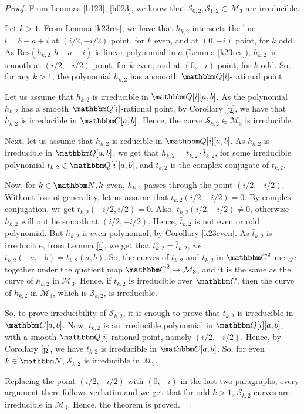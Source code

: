 \documentclass[reqno]{amsart}
\numberwithin{equation}{section}
\theoremstyle{plain}
\theoremstyle{definition}
\theoremstyle{definition}
\newcommand{\Q}{{\mathbbm Q}}
\newcommand{\C}{{\mathbbm C}}
\newcommand{\N}{{\mathbbm N}}
\newcommand{\ie}{\;\textit{i}.\textit{e}.\;\;}
\begin{document}
    \begin{proof}
        From Lemmas \ref{h123}, \ref{h023}, we know that $\mathscr{S}_{0,2}, \mathscr{S}_{1,2} \subset \mathcal{M}_{3}$ are irreducible.

        Let $k>1$. From Lemma \ref{k23res}, we have that $h_{k,2}$ intersects the line $l= b-a+i$ at $(i/2,-i/2)$ point, for $k$ even, and at $(0,-i)$ point, for $k$ odd. As $\mbox{Res}(h_{k,2},b-a+i)$ is linear polynomial in $a$ (Lemma \ref{k23res}), $h_{k,2}$ is smooth at $(i/2,-i/2)$ point, for $k$ even, and at $(0,-i)$ point, for $k$ odd. So, for any $k>1$, the polynomial $h_{k,2}$ has a smooth $\Q[i]$-rational point.

        Let us assume that $h_{k,2}$ is irreducible in $\Q[i][a,b]$. As the polynomial $h_{k,2}$ has a smooth $\Q[i]$-rational point, by Corollary \ref{p}, we have that $h_{k,2}$ is irreducible in $\C[a,b]$. Hence, the curve $\mathscr{S}_{k,2}\in \mathcal{M}_{3}$ is irreducible.

        Next, let us assume that $h_{k,2}$ is reducible in $\Q[i][a,b]$. As $h_{k,2}$ is irreducible in $\Q[a,b]$, we get that $h_{k,2}= t_{k,2} \cdot \bar{t}_{k,2}$, for some irreducible polynomial $t_{k,2}\in \Q[i][a,b]$, and $\bar{t}_{k,2}$ is the complex conjugate of $t_{k,2}$.

        Now, for $k\in \N, k$ even, $h_{k,2}$ passes through the point $(i/2,-i/2)$. Without loss of generality, let us assume that $t_{k,2}(i/2,-i/2)=0$. By complex conjugation, we get $\bar{t}_{k,2}(-i/2,i/2)=0$. Also, $\bar{t}_{k,2}(i/2,-i/2)\neq 0$, otherwise $h_{k,2}$ will not be smooth at $(i/2,-i/2)$. Hence, $\bar{t}_{k,2}$ is not even or odd polynomial. But $h_{k,2}$ is even polynomial, by Corollary \ref{k23even}. As $\bar{t}_{k,2}$ is irreducible, from Lemma \ref{t}, we get that $t_{k,2}^{\diamond} = \bar{t}_{k,2}$, \ie  $t_{k,2}(-a,-b)=\bar{t}_{k,2}(a,b)$. So, the curves of $t_{k,2}$ and $\bar{t}_{k,2}$ in $\C^{2}$ merge together under the quotient map $\C^{2}\rightarrow \mathcal{M}_{3}$, and it is the same as the curve of $h_{k,2}$ in $\mathcal{M}_{3}$. Hence, if $t_{k,2}$ is irreducible over $\C$, then the curve of $h_{k,2}$ in $\mathcal{M}_{3}$, which is $\mathscr{S}_{k,2}$, is irreducible.

        So, to prove irreducibility of $\mathscr{S}_{k,2}$, it is enough to prove that $t_{k,2}$ is irreducible in $\C[a,b]$. Now, $t_{k,2}$ is an irreducible polynomial in $\Q[i][a,b]$, with a smooth $\Q[i]$-rational point, namely $(i/2,-i/2)$. Hence, by Corollary \ref{p}, we have $t_{k,2}$ is irreducible in $\C[a,b]$. So, for even $k \in \N$, $\mathscr{S}_{k,2}$ is irreducible in $\mathcal{M}_{3}.$

        Replacing the point $(i/2,-i/2)$ with $(0,-i)$ in the last two paragraphs, every argument there follows verbatim and we get that for odd $k>1$, $\mathscr{S}_{k,2}$ curves are irreducible in $\mathcal{M}_{3}$.
        Hence, the theorem is proved.
    \end{proof} 
\end{document}
